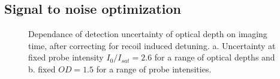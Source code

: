 \documentclass[12pt]{iopart}
\begin{document}
\subsection{Signal to noise optimization}
\begin{figure}
\caption{Dependance of detection uncertainty of optical depth on imaging time, after correcting for recoil induced detuning. a. Uncertainty at fixed probe intensity $I_0/I_{sat}=2.6$ for a range of optical depths and b. fixed $OD=1.5$ for a range of probe intensities.}  
\label{fig:SNR}
\end{figure}
\end{document}
